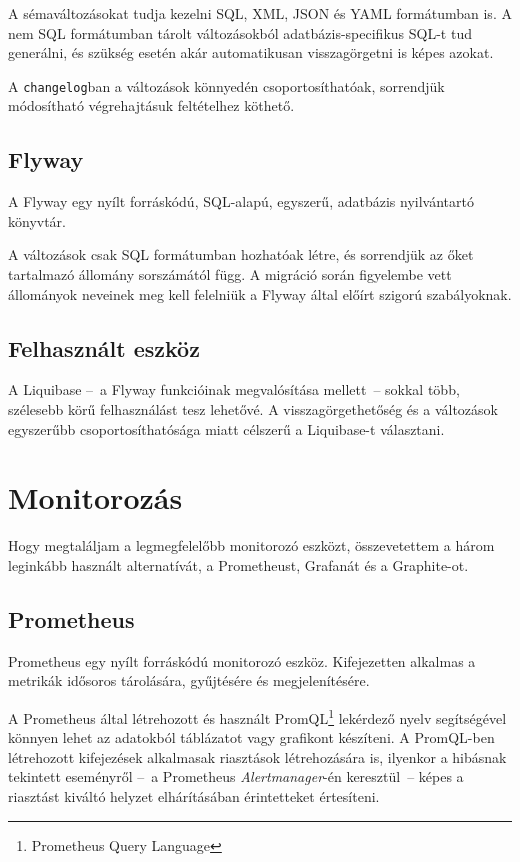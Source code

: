 A sémaváltozásokat tudja kezelni SQL, XML, JSON és YAML formátumban is. A nem SQL formátumban tárolt változásokból adatbázis-specifikus SQL-t tud generálni, és szükség esetén akár automatikusan visszagörgetni is képes azokat.

A \texttt{changelog}ban a változások könnyedén csoportosíthatóak, sorrendjük módosítható végrehajtásuk feltételhez köthető.


\subsection{Flyway}
A Flyway egy nyílt forráskódú, SQL-alapú, egyszerű, adatbázis nyilvántartó könyvtár.

A változások csak SQL formátumban hozhatóak létre, és sorrendjük az őket tartalmazó állomány sorszámától függ. A migráció során figyelembe vett állományok neveinek meg kell felelniük a Flyway által előírt szigorú szabályoknak.


\subsection{Felhasznált eszköz}
A Liquibase --~a Flyway funkcióinak megvalósítása mellett~--   sokkal több, szélesebb körű felhasználást tesz lehetővé. A visszagörgethetőség és a változások egyszerűbb csoportosíthatósága miatt célszerű a Liquibase-t választani.




\section{Monitorozás}\label{sec:metrikak_tervezes}
Hogy megtaláljam a legmegfelelőbb monitorozó eszközt, összevetettem a három leginkább használt alternatívát, a Prometheust, Grafanát és a Graphite-ot.

\subsection{Prometheus}
Prometheus egy nyílt forráskódú monitorozó eszköz. Kifejezetten alkalmas a metrikák idősoros tárolására, gyűjtésére és megjelenítésére.

A Prometheus által létrehozott és használt PromQL\footnote{Prometheus Query Language} lekérdező nyelv segítségével könnyen lehet az adatokból táblázatot vagy grafikont készíteni. A PromQL-ben létrehozott kifejezések alkalmasak riasztások létrehozására is, ilyenkor a hibásnak tekintett eseményről --~a Prometheus \emph{Alertmanager}-én keresztül~--   képes a riasztást kiváltó helyzet elhárításában érintetteket értesíteni.

